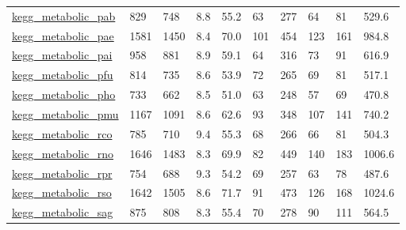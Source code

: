 \begin{longtable}{llllllllll}
 \href{http://santafe.edu/~aaronc/data/kegg2006_metabolic.zip}{kegg\_metabolic\_pab}                                          & 829        & 748   & 8.8    & 55.2   & 63    & 277    & 64     & 81     & 529.6   \\
 \href{http://santafe.edu/~aaronc/data/kegg2006_metabolic.zip}{kegg\_metabolic\_pae}                                          & 1581       & 1450  & 8.4    & 70.0   & 101   & 454    & 123    & 161    & 984.8   \\
 \href{http://santafe.edu/~aaronc/data/kegg2006_metabolic.zip}{kegg\_metabolic\_pai}                                          & 958        & 881   & 8.9    & 59.1   & 64    & 316    & 73     & 91     & 616.9   \\
 \href{http://santafe.edu/~aaronc/data/kegg2006_metabolic.zip}{kegg\_metabolic\_pfu}                                          & 814        & 735   & 8.6    & 53.9   & 72    & 265    & 69     & 81     & 517.1   \\
 \href{http://santafe.edu/~aaronc/data/kegg2006_metabolic.zip}{kegg\_metabolic\_pho}                                          & 733        & 662   & 8.5    & 51.0   & 63    & 248    & 57     & 69     & 470.8   \\
 \href{http://santafe.edu/~aaronc/data/kegg2006_metabolic.zip}{kegg\_metabolic\_pmu}                                          & 1167       & 1091  & 8.6    & 62.6   & 93    & 348    & 107    & 141    & 740.2   \\
 \href{http://santafe.edu/~aaronc/data/kegg2006_metabolic.zip}{kegg\_metabolic\_rco}                                          & 785        & 710   & 9.4    & 55.3   & 68    & 266    & 66     & 81     & 504.3   \\
 \href{http://santafe.edu/~aaronc/data/kegg2006_metabolic.zip}{kegg\_metabolic\_rno}                                          & 1646       & 1483  & 8.3    & 69.9   & 82    & 449    & 140    & 183    & 1006.6  \\
 \href{http://santafe.edu/~aaronc/data/kegg2006_metabolic.zip}{kegg\_metabolic\_rpr}                                          & 754        & 688   & 9.3    & 54.2   & 69    & 257    & 63     & 78     & 487.6   \\
 \href{http://santafe.edu/~aaronc/data/kegg2006_metabolic.zip}{kegg\_metabolic\_rso}                                          & 1642       & 1505  & 8.6    & 71.7   & 91    & 473    & 126    & 168    & 1024.6  \\
 \href{http://santafe.edu/~aaronc/data/kegg2006_metabolic.zip}{kegg\_metabolic\_sag}                                          & 875        & 808   & 8.3    & 55.4   & 70    & 278    & 90     & 111    & 564.5   \\

\end{longtable}
